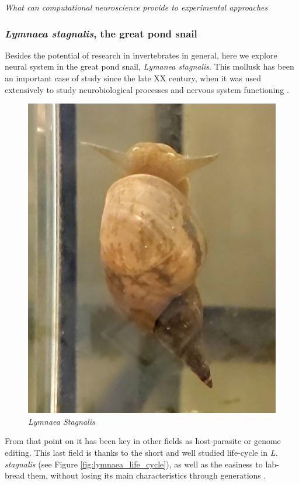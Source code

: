 \textit{What can computational neuroscience provide to experimental approaches}



\subsubsection{\textit{Lymnaea stagnalis}, the great pond snail}
Besides the potential of research in invertebrates in general, here we explore neural system in the great pond snail, \textit{Lymanea stagnalis}. This mollusk has been an important case of study since the late XX century, when it was used extensively to study neurobiological processes and nervous system functioning \parencite{Benjamin1979a}. %

\begin{figure}
	\centering
	\includegraphics[width=0.7\linewidth]{img/methods/lymnaea_copy.jpg} 
	\caption{\textit{Lymnaea Stagnalis}}
	\label{fig:snail}
\end{figure}  From that point on it has been key in other fields as host-parasite or genome editing. This last field is thanks to the short and well studied life-cycle in \textit{L. stagnalis} (see Figure \ref{fig:lymnaea_life_cycle}), as well as the easiness to lab-bread them, without losing its main characteristics through generations \parencite{noland_observations_1946}. 


